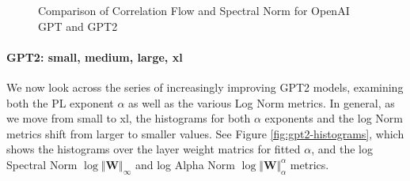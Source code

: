 \begin{figure}[t]
    \centering

    \caption{Comparison of Correlation Flow and Spectral Norm for OpenAI GPT and GPT2   }
    \label{fig:gpt-alpha-layers}
\end{figure}




\paragraph{GPT2: small, medium, large, xl} 

We now look across the series of increasingly improving GPT2 models, examining both the PL exponent $\alpha$ as well as the various Log Norm metrics.
In general, as we move from small to xl, the histograms for both $\alpha$ exponents and the log Norm metrics shift from larger to smaller values. 
See Figure \ref{fig:gpt2-histograms}, which shows the histograms over the layer weight matrics
for fitted $\alpha$, and the log Spectral Norm
 $\log\Vert\mathbf{W}\Vert_{\infty}$  
and log Alpha Norm
 $\log\Vert\mathbf{W}\Vert_{\alpha}^{\alpha}$ 
metrics.

